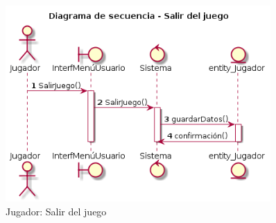 \begin{figure}[ht]
 \centering
 	  \includegraphics[width=0.9\textwidth]{./imatges/jugador/Salir_del_juego.png}
 \caption{Jugador: Salir del juego}
 \end{figure}
  
  
  
